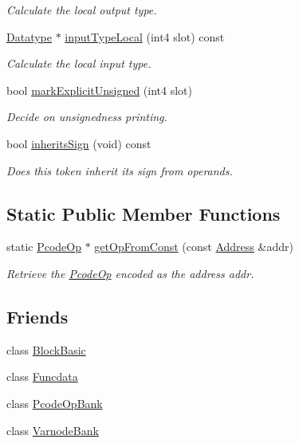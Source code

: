 \begin{DoxyCompactItemize}
\begin{DoxyCompactList}\small\item\em Calculate the local output type. \end{DoxyCompactList}\item 
\mbox{\hyperlink{class_datatype}{Datatype}} $\ast$ \mbox{\hyperlink{class_pcode_op_a6e269b80886b90fc24b39f331e909c84}{input\+Type\+Local}} (int4 slot) const
\begin{DoxyCompactList}\small\item\em Calculate the local input type. \end{DoxyCompactList}\item 
bool \mbox{\hyperlink{class_pcode_op_a4a9896fa29357fad1c29a0714863a493}{mark\+Explicit\+Unsigned}} (int4 slot)
\begin{DoxyCompactList}\small\item\em Decide on unsignedness printing. \end{DoxyCompactList}\item 
bool \mbox{\hyperlink{class_pcode_op_a9771335d96b658139c359db91a6825be}{inherits\+Sign}} (void) const
\begin{DoxyCompactList}\small\item\em Does this token inherit its sign from operands. \end{DoxyCompactList}\end{DoxyCompactItemize}
\subsection*{Static Public Member Functions}
\begin{DoxyCompactItemize}
\item 
static \mbox{\hyperlink{class_pcode_op}{Pcode\+Op}} $\ast$ \mbox{\hyperlink{class_pcode_op_a41be82b850ff5185e51268aead2c2802}{get\+Op\+From\+Const}} (const \mbox{\hyperlink{class_address}{Address}} \&addr)
\begin{DoxyCompactList}\small\item\em Retrieve the \mbox{\hyperlink{class_pcode_op}{Pcode\+Op}} encoded as the address {\itshape addr}. \end{DoxyCompactList}\end{DoxyCompactItemize}
\subsection*{Friends}
\begin{DoxyCompactItemize}
\item 
class \mbox{\hyperlink{class_pcode_op_a5d6670c2799e57561e4b5a6f31202633}{Block\+Basic}}
\item 
class \mbox{\hyperlink{class_pcode_op_a16ade990887167c11c41cb88121bb449}{Funcdata}}
\item 
class \mbox{\hyperlink{class_pcode_op_a9b0cf6f80beddec0b9f7745c87c22ba7}{Pcode\+Op\+Bank}}
\item 
class \mbox{\hyperlink{class_pcode_op_a794a269a99c505d3cd54abc16c456e0d}{Varnode\+Bank}}
\end{DoxyCompactItemize}


